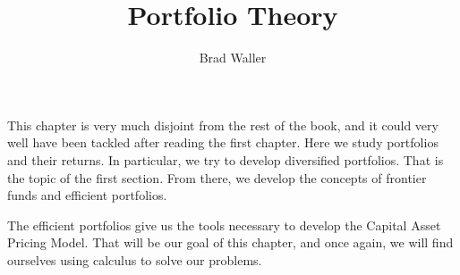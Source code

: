 \documentclass{ximera}
\title{Portfolio Theory}
\author{Brad Waller}
\begin{document}
\begin{abstract}
\end{abstract}
\maketitle

This chapter is very much disjoint from the rest of the book, and it could very well have been tackled after reading the first chapter. Here we study portfolios and their returns. In particular, we try to develop diversified portfolios. That is the topic of the first section. From there, we develop the concepts of frontier funds and efficient portfolios. 

The efficient portfolios give us the tools necessary to develop the Capital Asset Pricing Model. That will be our goal of this chapter, and once again, we will find ourselves using calculus to solve our problems. 
\end{document}
